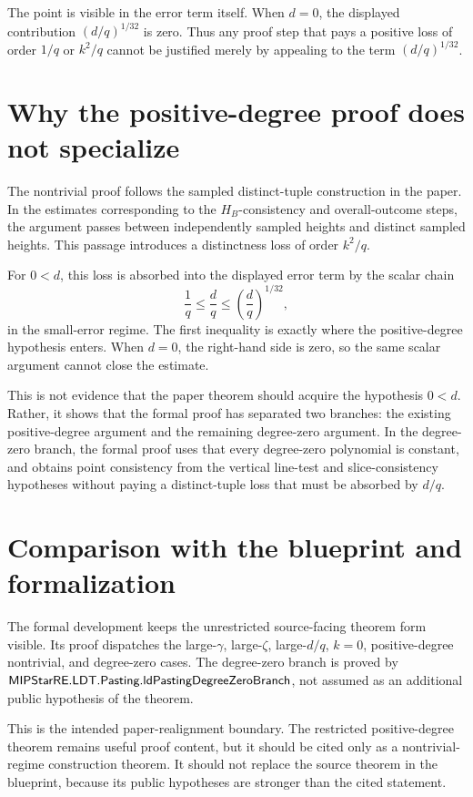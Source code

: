 \documentclass{article}
\begin{document}
The point is visible in the error term itself.  When \(d=0\), the displayed
contribution \((d/q)^{1/32}\) is zero.  Thus any proof step that pays a positive
loss of order \(1/q\) or \(k^2/q\) cannot be justified merely by appealing to
the term \((d/q)^{1/32}\).

\section{Why the positive-degree proof does not specialize}

The nontrivial proof follows the sampled distinct-tuple construction in the
paper.  In the estimates corresponding to the \(H_B\)-consistency and
overall-outcome steps, the argument passes between independently sampled
heights and distinct sampled heights.  This passage introduces a distinctness
loss of order \(k^2/q\).

For \(0<d\), this loss is absorbed into the displayed error term by the scalar
chain
\[
  \frac{1}{q}\le \frac{d}{q}\le \left(\frac{d}{q}\right)^{1/32},
\]
in the small-error regime.  The first inequality is exactly where the
positive-degree hypothesis enters.  When \(d=0\), the right-hand side is zero,
so the same scalar argument cannot close the estimate.

This is not evidence that the paper theorem should acquire the hypothesis
\(0<d\).  Rather, it shows that the formal proof has separated two branches:
the existing positive-degree argument and the remaining degree-zero argument.
In the degree-zero branch, the formal proof uses that every degree-zero
polynomial is constant, and obtains point consistency from the vertical
line-test and slice-consistency hypotheses without paying a distinct-tuple loss
that must be absorbed by \(d/q\).

\section{Comparison with the blueprint and formalization}

The formal development keeps the unrestricted source-facing theorem form
visible.  Its proof dispatches the large-\(\gamma\), large-\(\zeta\),
large-\(d/q\), \(k=0\), positive-degree nontrivial, and degree-zero cases.  The
degree-zero branch is proved by
\(\textsf{MIPStarRE.LDT.Pasting.ldPastingDegreeZeroBranch}\), not assumed as an
additional public hypothesis of the theorem.

This is the intended paper-realignment boundary.  The restricted
positive-degree theorem remains useful proof content, but it should be cited
only as a nontrivial-regime construction theorem.  It should not replace the
source theorem in the blueprint, because its public hypotheses are stronger
than the cited statement.
\end{document}
